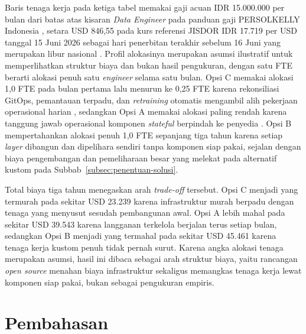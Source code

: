 Baris tenaga kerja pada ketiga tabel memakai gaji acuan IDR 15.000.000 per bulan dari batas atas kisaran \textit{Data Engineer} pada panduan gaji PERSOLKELLY Indonesia \autocite{persolkelly2023}, setara USD 846,55 pada kurs referensi JISDOR IDR 17.719 per USD tanggal 15 Juni 2026 sebagai hari penerbitan terakhir sebelum 16 Juni yang merupakan libur nasional \autocite{bi2026}. Profil alokasinya merupakan asumsi ilustratif untuk memperlihatkan struktur biaya dan bukan hasil pengukuran, dengan satu FTE berarti alokasi penuh satu \textit{engineer} selama satu bulan. Opsi C memakai alokasi 1,0 FTE pada bulan pertama lalu menurun ke 0,25 FTE karena rekonsiliasi GitOps, pemantauan terpadu, dan \textit{retraining} otomatis mengambil alih pekerjaan operasional harian \autocite{limoncelli2022gitops}, sedangkan Opsi A memakai alokasi paling rendah karena tanggung jawab operasional komponen \textit{stateful} berpindah ke penyedia \autocite{shankar2022operationalizing}. Opsi B mempertahankan alokasi penuh 1,0 FTE sepanjang tiga tahun karena setiap \textit{layer} dibangun dan dipelihara sendiri tanpa komponen siap pakai, sejalan dengan biaya pengembangan dan pemeliharaan besar yang melekat pada alternatif kustom pada Subbab~\ref{subsec:penentuan-solusi}.

Total biaya tiga tahun menegaskan arah \textit{trade-off} tersebut. Opsi C menjadi yang termurah pada sekitar USD 23.239 karena infrastruktur murah berpadu dengan tenaga yang menyusut sesudah pembangunan awal. Opsi A lebih mahal pada sekitar USD 39.543 karena langganan terkelola berjalan terus setiap bulan, sedangkan Opsi B menjadi yang termahal pada sekitar USD 45.461 karena tenaga kerja kustom penuh tidak pernah surut. Karena angka alokasi tenaga merupakan asumsi, hasil ini dibaca sebagai arah struktur biaya, yaitu rancangan \textit{open source} menahan biaya infrastruktur sekaligus memangkas tenaga kerja lewat komponen siap pakai, bukan sebagai pengukuran empiris.

\section{Pembahasan}
\label{sec:pembahasan-evaluasi}

